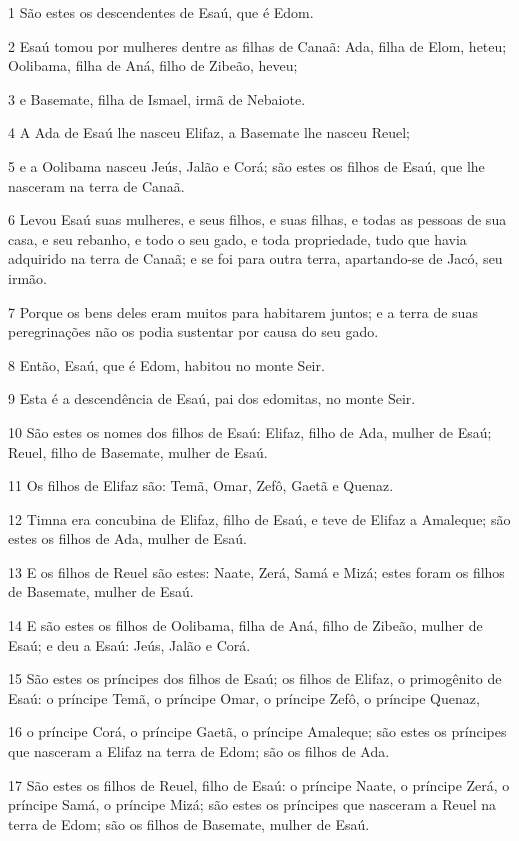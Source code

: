 \par 1 São estes os descendentes de Esaú, que é Edom.
\par 2 Esaú tomou por mulheres dentre as filhas de Canaã: Ada, filha de Elom, heteu; Oolibama, filha de Aná, filho de Zibeão, heveu;
\par 3 e Basemate, filha de Ismael, irmã de Nebaiote.
\par 4 A Ada de Esaú lhe nasceu Elifaz, a Basemate lhe nasceu Reuel;
\par 5 e a Oolibama nasceu Jeús, Jalão e Corá; são estes os filhos de Esaú, que lhe nasceram na terra de Canaã.
\par 6 Levou Esaú suas mulheres, e seus filhos, e suas filhas, e todas as pessoas de sua casa, e seu rebanho, e todo o seu gado, e toda propriedade, tudo que havia adquirido na terra de Canaã; e se foi para outra terra, apartando-se de Jacó, seu irmão.
\par 7 Porque os bens deles eram muitos para habitarem juntos; e a terra de suas peregrinações não os podia sustentar por causa do seu gado.
\par 8 Então, Esaú, que é Edom, habitou no monte Seir.
\par 9 Esta é a descendência de Esaú, pai dos edomitas, no monte Seir.
\par 10 São estes os nomes dos filhos de Esaú: Elifaz, filho de Ada, mulher de Esaú; Reuel, filho de Basemate, mulher de Esaú.
\par 11 Os filhos de Elifaz são: Temã, Omar, Zefô, Gaetã e Quenaz.
\par 12 Timna era concubina de Elifaz, filho de Esaú, e teve de Elifaz a Amaleque; são estes os filhos de Ada, mulher de Esaú.
\par 13 E os filhos de Reuel são estes: Naate, Zerá, Samá e Mizá; estes foram os filhos de Basemate, mulher de Esaú.
\par 14 E são estes os filhos de Oolibama, filha de Aná, filho de Zibeão, mulher de Esaú; e deu a Esaú: Jeús, Jalão e Corá.
\par 15 São estes os príncipes dos filhos de Esaú; os filhos de Elifaz, o primogênito de Esaú: o príncipe Temã, o príncipe Omar, o príncipe Zefô, o príncipe Quenaz,
\par 16 o príncipe Corá, o príncipe Gaetã, o príncipe Amaleque; são estes os príncipes que nasceram a Elifaz na terra de Edom; são os filhos de Ada.
\par 17 São estes os filhos de Reuel, filho de Esaú: o príncipe Naate, o príncipe Zerá, o príncipe Samá, o príncipe Mizá; são estes os príncipes que nasceram a Reuel na terra de Edom; são os filhos de Basemate, mulher de Esaú.
